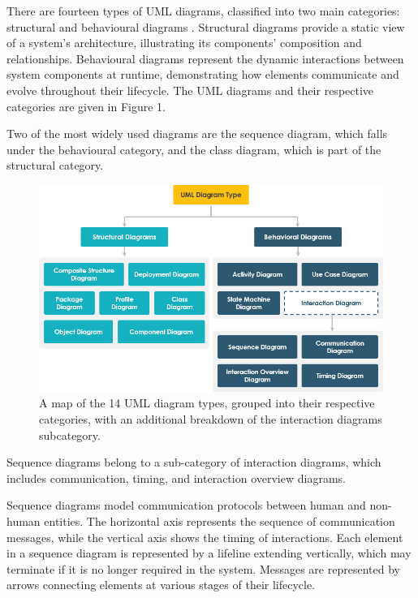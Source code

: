 \documentclass{article}
\newcounter{subsubsubsection}[subsubsection]
\begin{document}
{There are fourteen types of UML diagrams, classified into two main categories: structural and behavioural diagrams \cite{Seidl_Scholz_Huemer_Kappel_Duffy_2014}. Structural diagrams provide a static view of a system's architecture, illustrating its components' composition and relationships. Behavioural diagrams represent the dynamic interactions between system components at runtime, demonstrating how elements communicate and evolve throughout their lifecycle. The UML diagrams and their respective categories are given in Figure 1. 

Two of the most widely used diagrams are the sequence diagram, which falls under the behavioural category, and the class diagram, which is part of the structural category.

\begin{figure}[H]
    \centering
    \includegraphics[width=1.0\linewidth]{01-uml-diagram-types.png}
    \caption{A map of the 14 UML diagram types, grouped into their respective categories, with an additional breakdown of the interaction diagrams subcategory\cite{visualpara}.}
    \label{fig:UML Diagram Map}
\end{figure}


Sequence diagrams belong to a sub-category of interaction diagrams, which includes communication, timing, and interaction overview diagrams\cite{Seidl_Scholz_Huemer_Kappel_Duffy_2014}.

Sequence diagrams model communication protocols between human and non-human entities. The horizontal axis represents the sequence of communication messages, while the vertical axis shows the timing of interactions. Each element in a sequence diagram is represented by a lifeline extending vertically, which may terminate if it is no longer required in the system. Messages are represented by arrows connecting elements at various stages of their lifecycle. 

}
\end{document}
